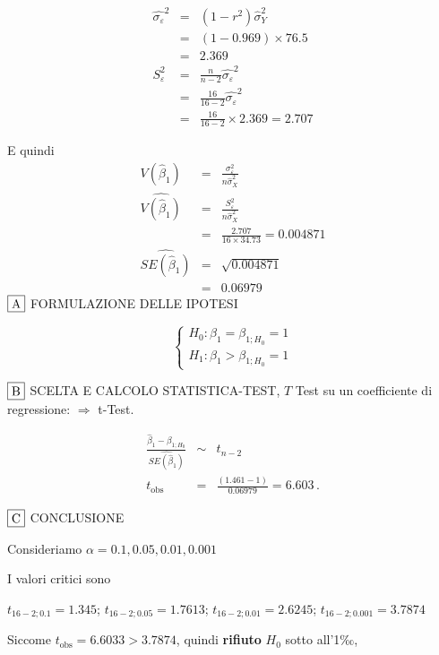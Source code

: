 \documentclass[
  11pt,
]{book}
\theoremstyle{mytheoremstyle}
\theoremstyle{mydefstyle}
\newenvironment{sol}
  {
  \begin{tcolorbox}[enhanced,breakable,arc=0.1mm,boxrule=1pt,colback=white,colframe=iblue,
  title=\bf \fontfamily{lmss}\selectfont \hspace{.5 cm} Soluzione,drop fuzzy shadow]

}{
\end{tcolorbox}
  }
\begin{document}
\begin{sol}
\begin{eqnarray*}
\hat{\sigma_\varepsilon}^2&=&(1-r^2)\hat\sigma_Y^2\\
&=& (1- 0.969 )\times 76.5 \\
   &=&  2.369 \\
   S_\varepsilon^2 &=& \frac{n} {n-2} \hat{\sigma_\varepsilon}^2\\
   &=&  \frac{ 16 } { 16 -2} \hat{\sigma_\varepsilon}^2 \\
 &=&  \frac{ 16 } { 16 -2} \times  2.369  =  2.707  
\end{eqnarray*}

E quindi\begin{eqnarray*}
V(\hat\beta_{1}) &=& \frac{\sigma_{\varepsilon}^{2}} {n \hat{\sigma}^{2}_{X}} \\
\widehat{V(\hat\beta_{1})} &=& \frac{S_{\varepsilon}^{2}} {n \hat{\sigma}^{2}_{X}} \\
 &=& \frac{ 2.707 } { 16 \times  34.73 } =  0.004871 \\
 \widehat{SE(\hat\beta_{1})}        &=&  \sqrt{ 0.004871 }\\
 &=&  0.06979 
\end{eqnarray*}
\(\fbox{A}\) FORMULAZIONE DELLE IPOTESI

\[\begin{cases}
   H_0: \beta_1 = \beta_{1;H_0}=1 \\
   H_1: \beta_1 > \beta_{1;H_0}=1 
   \end{cases}\]

\(\fbox{B}\) SCELTA E CALCOLO STATISTICA-TEST, \(T\)
Test su un coefficiente di regressione: \(\Rightarrow\) t-Test.

\begin{eqnarray*}
 \frac{\hat\beta_{ 1 } - \beta_{ 1 ;H_0}} {\widehat{SE(\hat\beta_{ 1 })}}&\sim&t_{n-2}\\
   t_{\text{obs}}
&=& \frac{ ( 1.461 -  1 )} { 0.06979 }
 =   6.603 \, .
\end{eqnarray*}

\(\fbox{C}\) CONCLUSIONE

Consideriamo \(\alpha=0.1, 0.05, 0.01, 0.001\)

I valori critici sono

\(t_{16-2;0.1}=1.345\); \(t_{16-2;0.05}=1.7613\); \(t_{16-2;0.01}=2.6245\); \(t_{16-2;0.001}=3.7874\)

Siccome \(t_\text{obs}=6.6033>3.7874\), quindi \textbf{rifiuto} \(H_0\) sotto all'1‰,


\end{sol}
\end{document}
